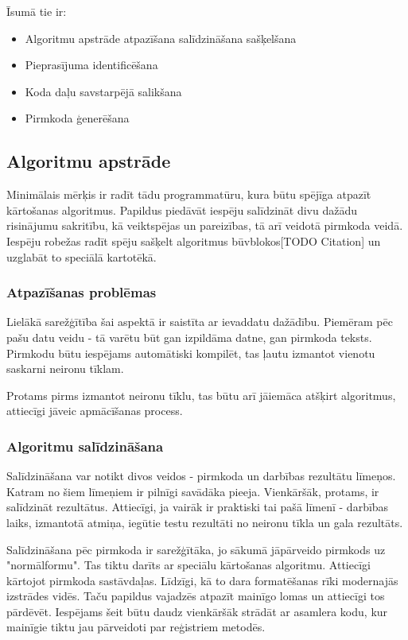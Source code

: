 Īsumā tie ir: 
\begin{itemize}
\item Algoritmu apstrāde
\subitem atpazīšana
\subitem salīdzināšana
\subitem sašķelšana
\item Pieprasījuma identificēšana
\item Koda daļu savstarpējā salikšana
\item Pirmkoda ģenerēšana
\end{itemize}

\subsection{Algoritmu apstrāde}
Minimālais mērķis ir radīt tādu programmatūru, kura būtu spējīga atpazīt kārtošanas algoritmus. Papildus piedāvāt iespēju salīdzināt divu dažādu risinājumu sakritību, kā veiktspējas un pareizības, tā arī veidotā pirmkoda veidā. Iespēju robežas radīt spēju sašķelt algoritmus būvblokos[TODO Citation] un uzglabāt to speciālā kartotēkā. 

\subsubsection{Atpazīšanas problēmas}
Lielākā sarežģītība šai aspektā ir saistīta ar ievaddatu dažādību. Piemēram pēc pašu datu veidu - tā varētu būt gan izpildāma datne, gan pirmkoda teksts. Pirmkodu būtu iespējams automātiski kompilēt, tas ļautu izmantot vienotu saskarni neironu tīklam. 

Protams pirms izmantot neironu tīklu, tas būtu arī jāiemāca atšķirt algoritmus, attiecīgi jāveic apmācīšanas process.

\subsubsection{Algoritmu salīdzināšana}
Salīdzināšana var notikt divos veidos - pirmkoda un darbības rezultātu līmeņos. Katram no šiem līmeņiem ir pilnīgi savādāka pieeja. Vienkāršāk, protams, ir salīdzināt rezultātus. Attiecīgi, ja vairāk ir praktiski tai pašā līmenī - darbības laiks, izmantotā atmiņa, iegūtie testu rezultāti no neironu tīkla un gala rezultāts.

Salīdzināšana pēc pirmkoda ir sarežģītāka, jo sākumā jāpārveido pirmkods uz "normālformu". Tas tiktu darīts ar speciālu kārtošanas algoritmu. Attiecīgi kārtojot pirmkoda sastāvdaļas. Līdzīgi, kā to dara formatēšanas rīki modernajās izstrādes vidēs. Taču papildus vajadzēs atpazīt mainīgo lomas un attiecīgi tos pārdēvēt. Iespējams šeit būtu daudz vienkāršāk strādāt ar asamlera kodu, kur mainīgie tiktu jau pārveidoti par reģistriem metodēs.

